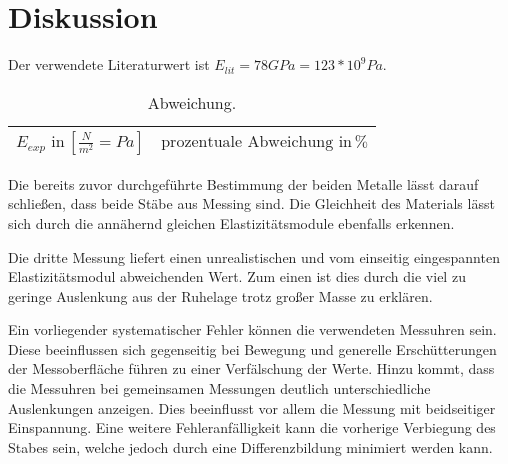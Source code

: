 \newpage
\section{Diskussion}
\label{sec:Diskussion}
Der verwendete Literaturwert ist $E_{lit} = 78 GPa = 123*10^9 Pa$\cite{litval}.
\begin{table}[h]
  \centering
  \label{tab:lit5}
  \begin{tabular}{ c c  }
    \toprule
    $E_{exp} \,\, \text{in} \, [\frac{N}{m^2}= Pa]$
   &{$\text{prozentuale Abweichung}\,\, \text{in} \, \% $} \\

    \midrule


    \bottomrule
  \end{tabular}
  \caption{Abweichung.}
\end{table}


Die bereits zuvor durchgeführte Bestimmung der beiden Metalle lässt darauf
schließen, dass beide Stäbe aus Messing sind. Die Gleichheit des Materials
lässt sich durch die annähernd gleichen Elastizitätsmodule ebenfalls
erkennen.

Die dritte Messung liefert einen unrealistischen und vom einseitig
eingespannten Elastizitätsmodul abweichenden Wert. Zum einen ist dies durch die viel zu geringe Auslenkung
aus der Ruhelage trotz großer Masse zu erklären.

Ein vorliegender systematischer Fehler können die verwendeten Messuhren sein.
Diese beeinflussen sich gegenseitig bei Bewegung und generelle Erschütterungen
der Messoberfläche führen zu einer Verfälschung der Werte. Hinzu kommt, dass
die Messuhren bei gemeinsamen Messungen deutlich unterschiedliche Auslenkungen
anzeigen. Dies beeinflusst vor allem die Messung mit beidseitiger
Einspannung.
Eine weitere Fehleranfälligkeit kann die vorherige Verbiegung des Stabes
sein, welche jedoch durch eine Differenzbildung minimiert werden kann.
